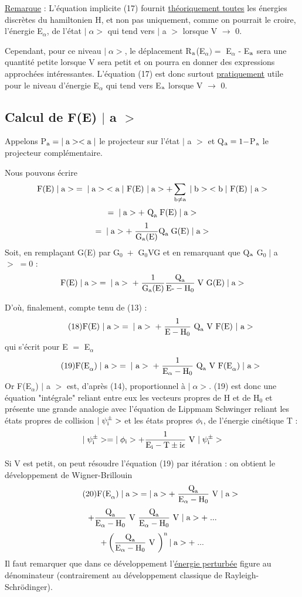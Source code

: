 \ul{Remarque} : L'équation implicite (17) fournit \ul{théoriquement toutes} les énergies
discrètes du hamiltonien H, et non pas uniquement, comme on pourrait le croire,
l'énergie E$_\alpha$, de l'état $|\;\alpha>$ qui tend vers $|$ a $>$ lorsque V $\to$ 0.

Cependant, pour ce niveau $|\;\alpha>$, le déplacement R$_{\text{a}}$(E$_\alpha) =$ E$_\alpha$ - E$_{\text{a}}$
sera une quantité petite lorsque V sera petit et on pourra en donner des
expressions approchées intéressantes. L'équation (17) est donc surtout \ul{pratiquement} utile pour le niveau d'énergie E$_\alpha$ qui tend vers E$_{\text{a}}$ lorsque V $\to$ 0.
\subsection{Calcul de F(E) $|$ a $>$}%
Appelons P$_{\text{a}}=|\;\text{a}><\text{a}\;|$ le projecteur sur l'état $|$ a $>$ et
Q$_{\text{a}}=1-$P$_{\text{a}}$ le projecteur complémentaire.

Nous pouvons écrire
\[
\text{F(E)}\;|\;\text{a}>\;=\;|\;\text{a}>\;<\text{a}\;|\text{ F(E) }|\;\text{a}>+\sum_{\text{b}\neq\text{a}}\;|\;\text{b}>\;<\text{b}\;|\text{ F(E) }|\;\text{a}>
\]
\[
=\;|\;\text{a}>+\text{ Q}_{\text{a}}\;\text{F(E)}\;|\;\text{a}>
\]
\[
=\;|\;\text{a}>+\;\frac{1}{\text{G}_{\text{a}}\text{(E)}}\text{Q}_{\text{a}}\;\text{G(E)}\;|\;\text{a}>
\]
Soit, en remplaçant G(E) par G$_0\;+$ G$_0$VG  et en remarquant que Q$_{\text{a}}$ G$_0\;|$ a $>\;=0$ :
\[
\text{F(E)}\;|\;\text{a}>\;=\;|\;\text{a}>\;+\;\frac{1}{\text{G}_{\text{a}}\text{(E)}}
\frac{\text{Q}_{\text{a}}}{\text{E-}-\text{H}_0}\;\text{V G(E)}\;|\;\text{a}>
\]

D'où, finalement, compte tenu de (13) :
\[
\tag{18}\text{F(E) }|\;\text{a}>\;=\;|\text{ a}>\;+\;
\frac{1}{\text{E}-\text{H}_0}\text{ Q}_{\text{a}}\text{ V F(E) }|\text{ a}>
\]
qui s'écrit pour E $=$ E$_\alpha$
\[
\tag{19}\text{F(E}_\alpha)\;|\text{ a}>\;=\;|\text{ a}>\;+\;
\frac{1}{\text{E}_\alpha-\text{H}_0}\text{ Q}_{\text{a}}\text{ V F(E}_\alpha)\;|\text{ a}>
\]
Or F(E$_\alpha$) $|$ a $>$ est, d'après (14), proportionnel à $|\;\alpha>$. (19) est donc une
équation "intégrale" reliant entre eux les vecteurs propres de H et de H$_0$ et
présente une grande analogie avec l'équation de Lippmam Schwinger reliant les
états propres de collision $|\;\psi_{\text{i}}^\pm>$ et les états propres $\phi_{\text{i}}$, de l'énergie cinétique T :
\[
|\;\psi_{\text{i}}^\pm>=|\;\phi_{\text{i}}>+\frac{1}{\text{E}_{\text{i}}-\text{T}\pm\text{i}\epsilon}\text{ V }|\;\psi_{\text{i}}^\pm>
\]


Si V est petit, on peut résoudre l'équation (19) par itération : on obtient
le développement de Wigner-Brillouin
\[
\tag{20}\text{F(E}_\alpha)\;|\;\text{a}>\;=|\;\text{a}>+\;\frac{\text{Q}_{\text{a}}}{\text{E}_\alpha-\text{H}_0}\text{ V }|\;\text{a}>
\]
\[
+\frac{\text{Q}_{\text{a}}}{\text{E}_\alpha-\text{H}_0}\text{ V }\frac{\text{Q}_{\text{a}}}{\text{E}_\alpha-\text{H}_0}\text{ V }|\;\text{a}>+\;...
\]
\[
+\left(\frac{\text{Q}_{\text{a}}}{\text{E}_\alpha-\text{H}_0}\text{ V }\right)^{\text{n}}|\;\text{a}>+\;...
\]
Il faut remarquer que dans ce développement l'\ul{énergie perturbée} figure au
dénominateur (contrairement au développement classique de Rayleigh-Schrödinger).

